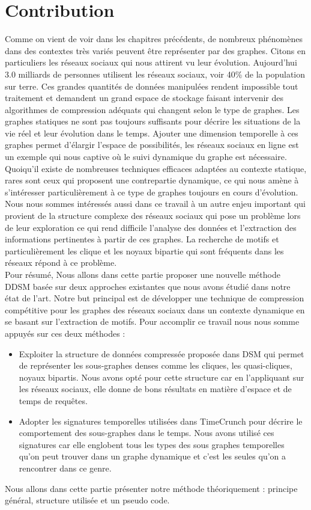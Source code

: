 \documentclass[a4paper,oneside,12pt]{report}
\theoremstyle{definition}
\begin{document}
	\chapter{Contribution}
Comme on vient de voir dans les chapitres précédents, de nombreux phénomènes dans des contextes très variés peuvent être représenter par des graphes. Citons en particuliers les réseaux sociaux qui nous attirent vu leur évolution. Aujourd'hui 3.0 milliards de personnes utilisent les réseaux sociaux, voir 40\% de la population sur terre. Ces grandes quantités de données manipulées rendent impossible tout traitement et demandent un grand espace de stockage faisant intervenir des algorithmes de compression adéquats qui changent selon le type de graphes. Les graphes statiques ne sont pas toujours suffisants pour décrire les situations de la vie réel et leur évolution dans le temps. Ajouter une dimension temporelle à ces graphes permet d'élargir l'espace de possibilités, les réseaux sociaux en ligne est un exemple qui nous captive où le suivi dynamique du graphe est nécessaire. Quoiqu'il existe de nombreuses techniques efficaces adaptées au contexte statique, rares sont ceux qui proposent une contrepartie dynamique, ce qui nous amène à s'intéresser particulièrement à ce type de graphes toujours en cours d'évolution. Nous nous sommes intéressés aussi dans ce travail à un autre enjeu important qui provient de la structure complexe des réseaux sociaux qui pose un problème lors de leur exploration ce qui rend difficile l'analyse des données et l'extraction des informations pertinentes à partir de ces graphes. La recherche de motifs et particulièrement les clique et les noyaux bipartie qui sont fréquents dans les réseaux répond à ce problème.\\
Pour résumé, Nous allons dans cette partie proposer une nouvelle méthode DDSM basée sur deux approches existantes que nous avons étudié dans notre état de l'art. Notre but principal est de développer une technique de compression compétitive pour les graphes des réseaux sociaux dans un contexte dynamique en se basant sur l'extraction de motifs. Pour accomplir ce travail nous nous somme appuyés sur ces deux méthodes :
\begin{itemize}
\item Exploiter la structure de données compressée proposée dans DSM \citep{hernandez2014compressed} qui permet de représenter les sous-graphes denses comme les cliques, les quasi-cliques, noyaux bipartis. Nous avons opté pour cette structure car en l'appliquant sur les réseaux sociaux, elle donne de bons résultats en matière d'espace et de temps de requêtes.  
\item Adopter les signatures temporelles utilisées dans TimeCrunch \citep{shah2015timecrunch} pour décrire le comportement des sous-graphes dans le temps. Nous avons utilisé ces signatures car elle englobent tous les types des sous graphes temporelles qu'on peut trouver dans un graphe dynamique et c'est les seules qu'on a rencontrer dans ce genre.
\end{itemize}	
Nous allons dans cette partie présenter notre méthode théoriquement : principe général, structure utilisée et un pseudo code.	
		
\end{document}

